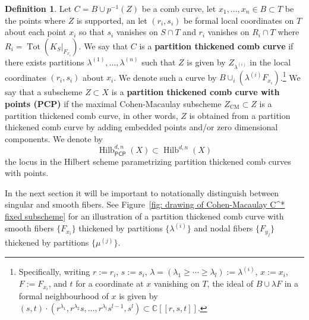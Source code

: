 \documentclass[12pt]{amsart}
\theoremstyle{definition}
\newtheorem{definition}[theorem]{Definition}
\newcommand{\CC} {\mathbb{C}}          %
\newcommand{\Hilb}{\operatorname{Hilb}}
\newcommand{\Tot}{\operatorname{Tot}}
\newcommand{\CM}{\operatorname{CM}}
\newcommand{\PCP}{\mathsf{PCP}}
\begin{document}
\begin{definition}\label{defn: partition thickened comb curve}
Let $C=B\cup p^{-1}(Z)$ be a comb curve, let $x_{1},\dotsc ,x_{n}\in
B\subset T$ be the points where $Z$ is supported, an let
$(r_{i},s_{i})$ be formal local coordinates on $T$ about each point
$x_{i}$ so that $s_{i}$ vanishes on $S\cap T$ and $r_{i}$
vanishes on $R_{i}\cap T$ where $R_{i}=\Tot (K_{S}|_{F_{x_{i}}})$. We
say that $C$ is a \textbf{partition thickened comb curve} if there
exists partitions $\lambda^{(1)},\dotsc ,\lambda^{(n)}$ such that $Z$
is given by $Z_{\lambda^{(i)}}$ in the local coordinates
$(r_{i},s_{i})$ about $x_{i}$.
We denote such a curve by
$B\cup_{i}\left(\lambda^{(i)}F_{x_{i}} \right)$.\footnote{Specifically, writing $r:=r_i$, $s:=s_i$, $\lambda = (\lambda_1 \geq \cdots \geq \lambda_l):=\lambda^{(i)}$, $x:=x_i$, $F:=F_{x_i}$, and $t$ for a coordinate at $x$ vanishing on $T$, the ideal of $B \cup \lambda F$ in a formal neighbourhood of $x$ is given by $(s,t) \cdot (r^{\lambda_{1}},r^{\lambda_{2}}s,\dotsc ,r^{\lambda_{l}}s^{l-1},s^{l}) \subset \CC[[r,s,t]]$.} We say that a
subscheme $Z\subset X$ is a \textbf{partition thickened comb curve
with points (PCP)} if the maximal Cohen-Macaulay subscheme
$Z_{\CM}\subset Z$ is a partition thickened comb curve, in other words,
$Z$ is obtained from a partition thickened comb curve by adding
embedded points and/or zero dimensional components. We denote by
\[
\Hilb^{d,n}_{\PCP}(X)\subset \Hilb^{d,n}(X)
\]
the locus in the Hilbert scheme parametrizing partition thickened
comb curves with points.
\end{definition}

In the next section it will be important to notationally distinguish
between singular and smooth fibers. See Figure~\ref{fig: drawing of
Cohen-Macaulay C^* fixed subscheme} for an illustration of a partition
thickened comb curve with smooth fibers $\{F_{x_{i}} \}$ thickened by
partitions $\{\lambda^{(i)} \}$ and nodal fibers  $\{F_{y_{j}} \}$ thickened by
partitions $\{\mu^{(j)} \}$.
\end{document}
